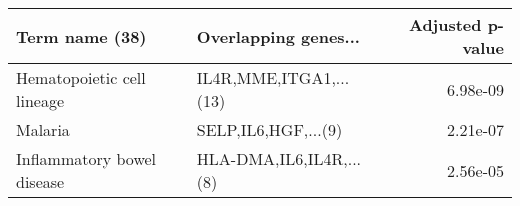 \begin{tabular}{llr}
\toprule
            Term name (38) &    Overlapping genes... &  Adjusted p-value \\
\midrule
Hematopoietic cell lineage &  IL4R,MME,ITGA1,...(13) &          6.98e-09 \\
                   Malaria &     SELP,IL6,HGF,...(9) &          2.21e-07 \\
Inflammatory bowel disease & HLA-DMA,IL6,IL4R,...(8) &          2.56e-05 \\
\bottomrule
\end{tabular}
